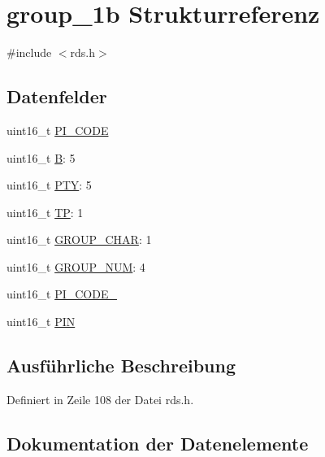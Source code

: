 \hypertarget{structgroup__1b}{}\section{group\+\_\+1b Strukturreferenz}
\label{structgroup__1b}


{\ttfamily \#include $<$rds.\+h$>$}

\subsection*{Datenfelder}
\begin{DoxyCompactItemize}
\item 
uint16\+\_\+t \hyperlink{structgroup__1b_a5cd9b1f6413028425796c1129aa8fd87}{P\+I\+\_\+\+C\+O\+D\+E}
\item 
uint16\+\_\+t \hyperlink{structgroup__1b_ae783bd90764c8455228772c025c064e4}{B}\+: 5
\item 
uint16\+\_\+t \hyperlink{structgroup__1b_a0474967478fbbc2c71b800d2e0132d45}{P\+T\+Y}\+: 5
\item 
uint16\+\_\+t \hyperlink{structgroup__1b_ab9e634c63b0d95a96716d5f6d7f06d72}{T\+P}\+: 1
\item 
uint16\+\_\+t \hyperlink{structgroup__1b_a66d4119990dc4c3e040a43885e9bb953}{G\+R\+O\+U\+P\+\_\+\+C\+H\+A\+R}\+: 1
\item 
uint16\+\_\+t \hyperlink{structgroup__1b_a9f692e9f76ee88348d426bcd4e9bc70b}{G\+R\+O\+U\+P\+\_\+\+N\+U\+M}\+: 4
\item 
uint16\+\_\+t \hyperlink{structgroup__1b_ae86fed9d07832a5c3cc36d5aaa064bcb}{P\+I\+\_\+\+C\+O\+D\+E\+\_}
\item 
uint16\+\_\+t \hyperlink{structgroup__1b_a23b9db30b873d9b45f435df66328a784}{P\+I\+N}
\end{DoxyCompactItemize}


\subsection{Ausführliche Beschreibung}


Definiert in Zeile 108 der Datei rds.\+h.



\subsection{Dokumentation der Datenelemente}
\hypertarget{structgroup__1b_ae783bd90764c8455228772c025c064e4}{}
